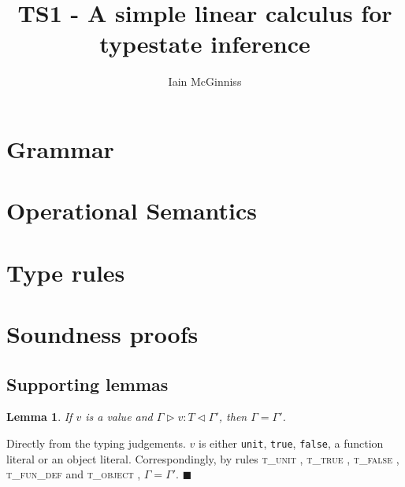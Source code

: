 \documentclass{article}
\newtheorem{lem}{Lemma}
\newcommand{\tunit}{\textsc{t\_unit} }
\newcommand{\ttrue}{\textsc{t\_true} }
\newcommand{\tfalse}{\textsc{t\_false} }
\newcommand{\tobj}{\textsc{t\_object} }
\newcommand{\tfundef}{\textsc{t\_fun\_def} }
\newcommand{\typerule}[4]{#1 \triangleright #2 : #3 \triangleleft #4}
\newcommand{\qed}{$\blacksquare$}
\newenvironment{proof}{\vspace{1ex}\noindent{\bf Proof}\hspace{0.5em}}
  {\hfill\qed\vspace{1ex}}
\begin{document}
\title{TS1 - A simple linear calculus for typestate inference}
\author{Iain McGinniss}

\section{Grammar}

\ottgrammartabular{
\ottt\ottinterrule
\ottv\ottinterrule
\otto\ottinterrule
\ottT\ottinterrule
\ottO\ottinterrule
}

\section{Operational Semantics}

\ottgrammartabular{
\ottmu\ottinterrule
}


\ottdefnreduce

\section{Type rules}
\label{sec:typerules}

\ottgrammartabular{
\ottG\ottinterrule
\ottT\ottinterrule
}


\ottdefnstoretype

\ottdefnmethtype

\ottdefnsubtype

\ottdefnobjeffextract

\ottdefntype

\section{Soundness proofs}

\subsection{Supporting lemmas}

\begin{lem}
\label{lem:valuectx}
If $v$ is a value and $\typerule{\Gamma}{v}{T}{\Gamma'}$, then $\Gamma = \Gamma'$.
\end{lem}
\begin{proof}
Directly from the typing judgements. $v$ is either {\tt unit}, {\tt true},
{\tt false}, a function literal or an object literal.
Correspondingly, by rules \tunit,
\ttrue, \tfalse, 
\tfundef and \tobj, $\Gamma = \Gamma'$.
\end{proof}
\end{document}
